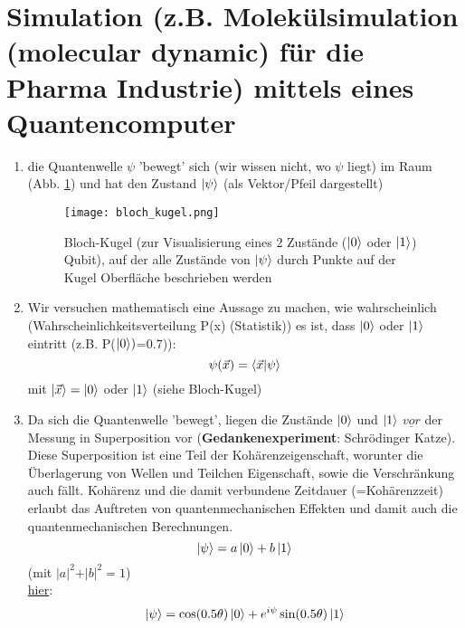 \section{Simulation (z.B. Molekülsimulation (molecular dynamic) für die Pharma Industrie) mittels eines Quantencomputer}

\begin{enumerate}
    \item die Quantenwelle $\psi$ 'bewegt' sich (wir wissen nicht, wo $\psi$ liegt) im Raum (Abb. \ref{bloch}) und hat den Zustand $\ket{\psi}$
        (als Vektor/Pfeil dargestellt)
    \begin{SCfigure}[][h!]
        \texttt{[image: bloch\_kugel.png]}
        \caption{Bloch-Kugel (zur Visualisierung eines 2 Zustände ($\ket{0}$ oder $\ket{1}$) Qubit), auf der
                    alle Zustände von $\ket{\psi}$ durch Punkte auf der Kugel Oberfläche beschrieben werden} 
        \label{bloch} 
    \end{SCfigure}
    \item Wir versuchen mathematisch eine Aussage zu machen, wie wahrscheinlich (Wahrscheinlichkeitsverteilung P(x) (Statistik)) es ist, dass $\ket{0}$
        oder $\ket{1}$ eintritt (z.B. P($\ket{0})$=0.7)):
        \begin{equation*}
            \psi(\vec{x})=\braket{\vec{x}|\psi}
        \end{equation*}
        mit $\ket{\vec{x}}=\ket{0}$ oder $\ket{1}$ (siehe Bloch-Kugel)
    \item Da sich die Quantenwelle 'bewegt', liegen die Zustände $\ket{0}$ und $\ket{1}$ $\underline{vor}$ der Messung
        in Superposition vor (\textbf{Gedankenexperiment}: Schrödinger Katze). Diese Superposition ist eine Teil der Kohärenzeigenschaft, worunter 
        die Überlagerung von Wellen und Teilchen Eigenschaft, sowie die Verschränkung auch fällt. Kohärenz und die damit 
        verbundene Zeitdauer (=Kohärenzzeit) erlaubt das Auftreten von quantenmechanischen Effekten und damit auch 
        die quantenmechanischen Berechnungen.
        \begin{equation*}
            \ket{\psi}=a\ket{0}+b\ket{1} 
        \end{equation*}
        (mit $\vert a\vert^2+\vert b\vert^2=1$)\\
        \underline{hier}:
        \begin{equation*}
            \ket{\psi}=\cos(0.5\theta)\ket{0}+e^{i\psi}\sin(0.5\theta)\ket{1}
        \end{equation*}

\end{enumerate}
